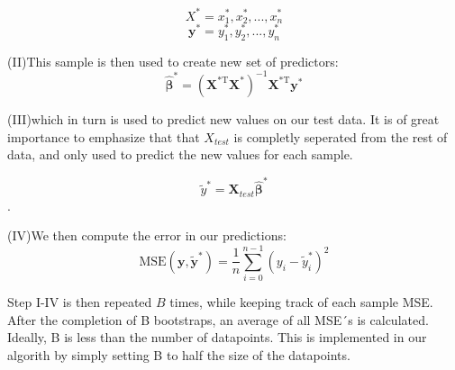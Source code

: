\documentclass[11pt, a4paper]{article}
\begin{document}
$$X^* = x_{1}^{*}, x_{2}^{*}, ... ,x_{n}^{*}$$
$$\bm{y}^*= y_{1}^{*}, y_{2}^{*}, ... ,y_{n}^{*}$$

(II)This sample is then used to create new set of predictors:
\[
  \bm{\hat{\beta}}^* = \left(\bm{X}^\text{*T}\bm{X}^*\right)^{-1}\bm{X}^\text{*T}\bm{y}^*
\]

(III)which in turn is used to predict new values on our test data. It is of great importance to emphasize that that $X_{test}$ is completly seperated from the rest of data, and only used to predict the new values for each sample.


$$\tilde{y}^* = \bm{X}_{test}\bm{\hat{\beta}^*}$$.

(IV)We then compute the error in our predictions:
\[
  \text{MSE}(\boldsymbol{y},\boldsymbol{\tilde{y}^*}) = \frac{1}{n}
  \sum_{i=0}^{n-1}(y_i-\tilde{y}^{*}_i)^2
\]

Step I-IV is then repeated $B$ times, while keeping track of each sample MSE. After the completion of B bootstraps, an average of all MSE´s is calculated. Ideally, B is less than the number of datapoints. This is implemented in our algorith by simply setting B to half the size of the datapoints. 
\end{document}
